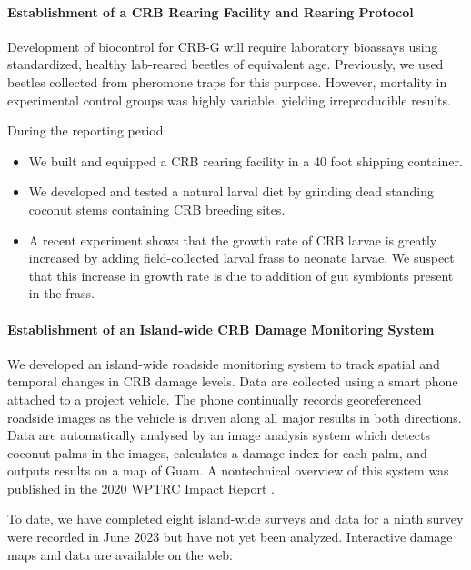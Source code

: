\begin{refsection}
\paragraph{Establishment of a CRB Rearing Facility and Rearing Protocol}

Development of biocontrol for CRB-G will require laboratory bioassays using standardized, healthy lab-reared beetles of equivalent age. Previously, we used beetles collected from pheromone traps for this purpose. However, mortality in experimental control groups was highly variable, yielding irreproducible results. 

During the reporting period:
\begin{itemize}
	\item We built and equipped a CRB rearing facility in a 40 foot shipping container.  
	\item We developed and tested a natural larval diet by grinding dead standing coconut stems containing CRB breeding sites.
	\item A recent experiment shows that the growth rate of CRB larvae is greatly increased by adding field-collected larval frass to neonate larvae. We suspect that this increase in growth rate is due to addition of gut symbionts present in the frass.	
\end{itemize}

\paragraph{Establishment of an Island-wide CRB Damage Monitoring System}

We developed an island-wide roadside monitoring system to track spatial and temporal changes in CRB damage levels. Data are collected using a smart phone attached to a project vehicle. The phone continually records georeferenced roadside images as the vehicle is driven along all major results in both directions. Data are automatically analysed by an image analysis system which detects coconut palms in the images, calculates a damage index for each palm, and outputs results on a map of Guam. A nontechnical overview of this system was published in the 2020 WPTRC Impact Report \parencite{moore_using_2020-1}.

To date, we have completed eight island-wide surveys and data for a ninth survey were recorded in June 2023 but have not yet been analyzed. Interactive damage maps and data are available on the web: 

\begin{itemize}
	

\end{itemize}
\end{refsection}
